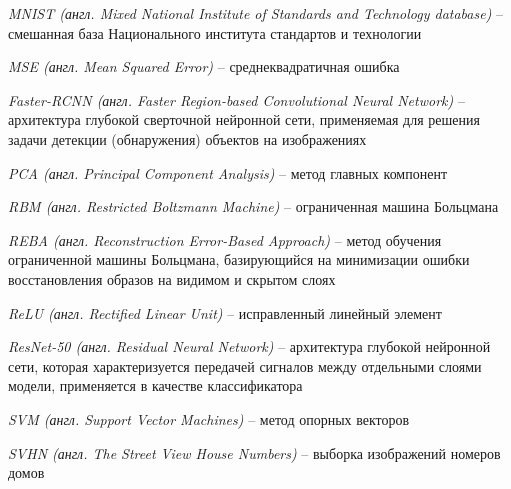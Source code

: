 \textit{MNIST (англ. Mixed National Institute of Standards and Technology database)} -- смешанная база Национального института стандартов и технологии

\textit{MSE (англ. Mean Squared Error)} -- среднеквадратичная ошибка

\textit{Faster-RCNN (англ. Faster Region-based Convolutional Neural Network)} -- архитектура глубокой сверточной нейронной сети, применяемая для решения задачи детекции (обнаружения) объектов на изображениях

\textit{PCA (англ. Principal Component Analysis)} -- метод главных компонент

\textit{RBM (англ. Restricted Boltzmann Machine)} -- ограниченная машина Больцмана

\textit{REBA (англ. Reconstruction Error-Based Approach)} -- метод обучения ограниченной машины Больцмана, базирующийся на минимизации ошибки восстановления образов на видимом и скрытом слоях

\textit{ReLU (англ. Rectified Linear Unit)} -- исправленный линейный элемент

\textit{ResNet-50 (англ. Residual Neural Network)} -- архитектура глубокой нейронной сети, которая характеризуется передачей сигналов между отдельными слоями модели, применяется в качестве классификатора

\textit{SVM (англ. Support Vector Machines)} -- метод опорных векторов

\textit{SVHN (англ. The Street View House Numbers)} -- выборка изображений номеров домов






